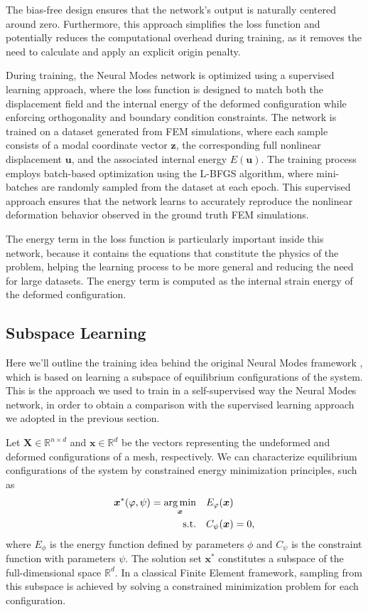 The bias-free design ensures that the network's output is naturally centered around zero. Furthermore, this approach simplifies the loss function and potentially reduces the computational overhead during training, as it removes the need to calculate and apply an explicit origin penalty. 

During training, the Neural Modes network is optimized using a supervised learning approach, where the loss function is designed to match both the displacement field and the internal energy of the deformed configuration while enforcing orthogonality and boundary condition constraints. The network is trained on a dataset generated from FEM simulations, where each sample consists of a modal coordinate vector \( \bm{z} \), the corresponding full nonlinear displacement \( \bm{u} \), and the associated internal energy \( E(\bm{u}) \). The training process employs batch-based optimization using the L-BFGS algorithm, where mini-batches are randomly sampled from the dataset at each epoch. This supervised approach ensures that the network learns to accurately reproduce the nonlinear deformation behavior observed in the ground truth FEM simulations.

The energy term in the loss function is particularly important inside this network, because it contains the equations that constitute the physics of the problem, helping the learning process to be more general and reducing the need for large datasets. The energy term is computed as the internal strain energy of the deformed configuration.

\subsection{Subspace Learning}
Here we'll outline the training idea behind the original Neural Modes framework \cite{Wang_Du_Coros_Thomaszewski_2024}, which is based on learning a subspace of equilibrium configurations of the system. This is the approach we used to train in a self-supervised way the Neural Modes network, in order to obtain a comparison with the supervised learning approach we adopted in the previous section.


Let \( \bm{X} \in \mathbb{R}^{n \times d} \) and \( \bm{x} \in \mathbb{R}^{d} \) be the vectors representing the undeformed and deformed configurations of a mesh, respectively. We can characterize equilibrium configurations of the system by constrained energy minimization principles, such as 
\begin{align}
    \label{eq:constrained_energy_minimization}
    \bm{x}^*(\varphi, \psi) = \underset{\bm{x}}{\operatorname*{arg\,min}} \quad & E_\varphi(\bm{x}) \\
    \text{s.t.} \quad & C_\psi(\bm{x}) = 0, \nonumber
\end{align}
where \( E_\phi \) is the energy function defined by parameters \(\phi\) and \( C_\psi \) is the constraint function with parameters \(\psi\). The solution set \( \bm{x}^*\) constitutes a subspace of the full-dimensional space \( \mathbb{R}^d \). In a classical Finite Element framework, sampling from this subspace is achieved by solving a constrained minimization problem for each configuration. 

